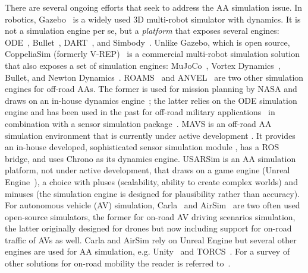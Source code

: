 \documentclass[12pt,twocolumn]{article}
\begin{document}
There are several ongoing efforts that seek to address the AA simulation issue. In robotics, Gazebo~\cite{gazebo,koenig2004design} is a widely used 3D multi-robot simulator with dynamics.  It is not a simulation engine per se, but a \textit{platform} that exposes several engines: ODE~\cite{ode2015}, Bullet~\cite{bulletPhysicsEngine2020}, DART~\cite{dart2018}, and Simbody~\cite{sherman2011simbody}. Unlike Gazebo, which is open source, CoppeliaSim (formerly V-REP)~\cite{V-REP2013} is a commercial multi-robot simulation solution that also exposes a set of simulation engines: MuJoCo~\cite{todorovMujoco2012}, Vortex Dynamics~\cite{cmLabs2020}, Bullet, and Newton Dynamics~\cite{newtonDynamics2020}. ROAMS~\cite{abhiROAMS2004} and ANVEL~\cite{ANVEL-website} are two other simulation engines for off-road AAs. The former is used for mission planning by NASA and draws on an in-house dynamics engine~\cite{DARTS}; the latter relies on the ODE simulation engine and has been used in the past for off-road military applications~\cite{ANVELdescription2012} in combination with a sensor simulation package~\cite{VANE-2012}. MAVS is an off-road AA simulation environment that is currently under active development \cite{mavsCarruth2018}. It provides an in-house developed, sophisticated sensor simulation module \cite{goodin2018enabling,goodin2019predicting}, has a ROS bridge, and uses Chrono as its dynamics engine. USARSim is an AA simulation platform, not under active development, that draws on a game engine (Unreal Engine~\cite{unrealEngine}), a choice with pluses (scalability, ability to create complex worlds) and minuses (the simulation engine is designed for plausibility rather than accuracy). For autonomous vehicle (AV) simulation, Carla~\cite{carlaAVsim2017} and AirSim~\cite{shah2018airsim} are two often used open-source simulators, the former for on-road AV driving scenarios simulation, the latter originally designed for drones but now including support for on-road traffic of AVs as well. Carla and AirSim rely on Unreal Engine but several other engines are used for AA simulation, e.g. Unity~\cite{unityGaming} and TORCS~\cite{torcsRacingSimulation2020}. For a survey of other solutions for on-road mobility the reader is referred to~\cite{surveyAVsimulationBerger2019,reviewPerception2019}.
\end{document}
